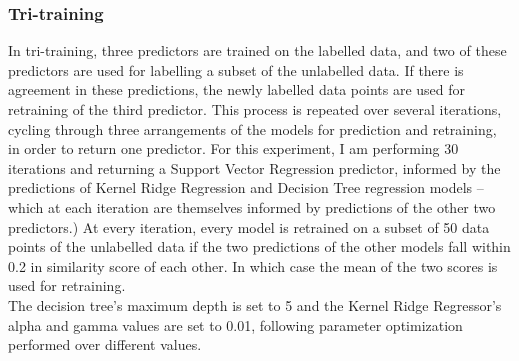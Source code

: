 \documentclass[11pt]{article}
\begin{document}
\subsubsection{Tri-training}
In tri-training, three predictors are trained on the labelled data, and two of these predictors are used for labelling a subset of the unlabelled data. If there is agreement in these predictions, the newly labelled data points are used for retraining of the third predictor. This process is repeated over several iterations, cycling through three arrangements of the models for prediction and retraining, in order to return one predictor. For this experiment, I am performing 30 iterations and returning a Support Vector Regression predictor, informed by the predictions of Kernel Ridge Regression and Decision Tree regression models -- which at each iteration are themselves informed by predictions of the other two predictors.) At every iteration, every model is retrained on a subset of 50 data points of the unlabelled data if the two predictions of the other models fall within 0.2 in similarity score of each other. In which case the mean of the two scores is used for retraining. \\

The decision tree's maximum depth is set to 5 and the Kernel Ridge Regressor's alpha and gamma values are set to 0.01, following parameter optimization performed over different values.\\
\end{document}
